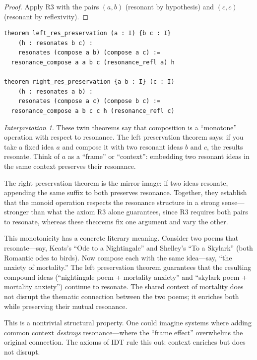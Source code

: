 \documentclass[11pt,openany]{book}
\theoremstyle{definition}
\theoremstyle{plain}
\theoremstyle{remark}
\newtheorem{interpretation}[axiom]{Interpretation}
\begin{document}
\begin{proof}
Apply R3 with the pairs $(a, b)$ (resonant by hypothesis) and $(c, c)$ (resonant by reflexivity).
\end{proof}

\begin{lstlisting}[language=Lean4]
theorem left_res_preservation (a : I) {b c : I}
    (h : resonates b c) :
    resonates (compose a b) (compose a c) :=
  resonance_compose a a b c (resonance_refl a) h

theorem right_res_preservation {a b : I} (c : I)
    (h : resonates a b) :
    resonates (compose a c) (compose b c) :=
  resonance_compose a b c c h (resonance_refl c)
\end{lstlisting}

\begin{interpretation}
These twin theorems say that composition is a ``monotone'' operation with respect to resonance. The left preservation theorem says: if you take a fixed idea $a$ and compose it with two resonant ideas $b$ and $c$, the results resonate. Think of $a$ as a ``frame'' or ``context'': embedding two resonant ideas in the same context preserves their resonance.

The right preservation theorem is the mirror image: if two ideas resonate, appending the same suffix to both preserves resonance. Together, they establish that the monoid operation respects the resonance structure in a strong sense---stronger than what the axiom R3 alone guarantees, since R3 requires both pairs to resonate, whereas these theorems fix one argument and vary the other.

This monotonicity has a concrete literary meaning. Consider two poems that resonate---say, Keats's ``Ode to a Nightingale'' and Shelley's ``To a Skylark'' (both Romantic odes to birds). Now compose each with the same idea---say, ``the anxiety of mortality.'' The left preservation theorem guarantees that the resulting compound ideas (``nightingale poem + mortality anxiety'' and ``skylark poem + mortality anxiety'') continue to resonate. The shared context of mortality does not disrupt the thematic connection between the two poems; it enriches both while preserving their mutual resonance.

This is a nontrivial structural property. One could imagine systems where adding common context \emph{destroys} resonance---where the ``frame effect'' overwhelms the original connection. The axioms of IDT rule this out: context enriches but does not disrupt.
\end{interpretation}
\end{document}
